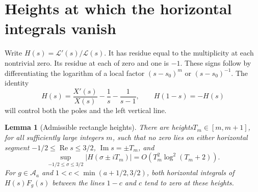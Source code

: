\documentclass[11pt]{article}
\newtheorem{lemma}[theorem]{Lemma}
\theoremstyle{definition}
\theoremstyle{remark}
\numberwithin{equation}{section}
\newcommand{\A}{\mathcal A}
\begin{document}
\section{Heights at which the horizontal integrals vanish}
\label{sec:heights}

Write $H(s)=\mathcal L'(s)/\mathcal L(s)$.
It has residue equal to the multiplicity at each nontrivial zero.
Its residue at each of zero and one is $-1$.
These signs follow by differentiating the logarithm of a local factor
$(s-s_0)^m$ or $(s-s_0)^{-1}$.
The identity
\begin{equation}
 H(s)=\frac{X'(s)}{X(s)}-\frac1s-\frac1{s-1},
 \qquad H(1-s)=-H(s)
 \label{eq:log-reflection}
\end{equation}
will control both the poles and the left vertical line.

\begin{lemma}[Admissible rectangle heights]
There are heights\label{lem:heights} $T_m\in[m,m+1]$, for all sufficiently large integers $m$,
such that no zero lies on either horizontal segment
$-1/2\leq\operatorname{Re}s\leq3/2$, $\operatorname{Im}s=\pm T_m$,
and
\begin{equation}
 \sup_{-1/2\leq\sigma\leq3/2}|H(\sigma\pm iT_m)|
       =O(T_m^2\log^2(T_m+2)).
 \label{eq:horizontal-H}
\end{equation}
For $g\in\A_a$ and $1<c<\min(a+1/2,3/2)$, both horizontal integrals
of $H(s)F_g(s)$ between the lines $1-c$ and $c$ tend to zero at these heights.
\end{lemma}
\end{document}
